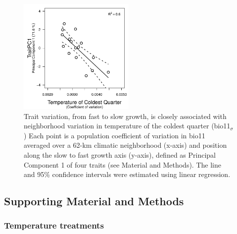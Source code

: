 \documentclass[11pt, oneside]{article}
\begin{document}
\begin{figure}[h!]
\centerline{\includegraphics[width=0.5\textwidth]{Figures/FigureS_bio11PC1.pdf}}
\fontsize{10}{12}
\selectfont
\caption[Trait PC1 versus bio11_cva_SA]{Trait variation, from fast to slow growth, is closely associated with neighborhood variation in temperature of the coldest quarter (bio11$_\sigma$) Each point is a population coefficient of variation in bio11 averaged over a 62-km climatic neighborhood  (x-axis) and position along the slow to fast growth axis (y-axis), defined as Principal Component 1 of four traits (see Material and Methods). The line and 95\% confidence intervals were estimated using linear regression.}
\label{fig:FigS_bio11PC1}
\end{figure}

\clearpage


\subsection*{Supporting Material and Methods}

\subsubsection*{Temperature treatments}
\end{document}
